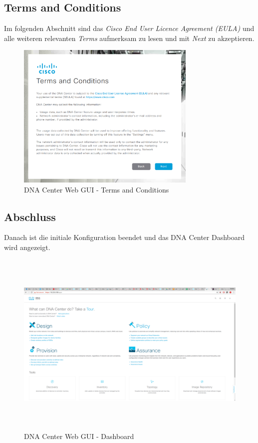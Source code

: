 \subsection{Terms and Conditions}
Im folgenden Abschnitt sind das \textit{Cisco End User Licence Agreement (EULA)} und alle weiteren relevanten \textit{Terms} aufmerksam zu lesen und mit \textit{Next} zu akzeptieren. 

\begin{figure}[H]
	\centering
	\includegraphics[height=7cm]{img/installguide/webgui-termsandcondition.png}
	\caption{DNA Center Web GUI - Terms and Conditions}
	\label{fig:installguide-dna-center-gui-4}
\end{figure}

\subsection{Abschluss}
Danach ist die initiale Konfiguration beendet und das DNA Center Dashboard wird angezeigt.

\begin{figure}[H]
	\centering
	\includegraphics[height=9cm]{img/sc_008.png}
	\caption{DNA Center Web GUI - Dashboard}
	\label{fig:installguide-dna-center-gui-5}
\end{figure}

